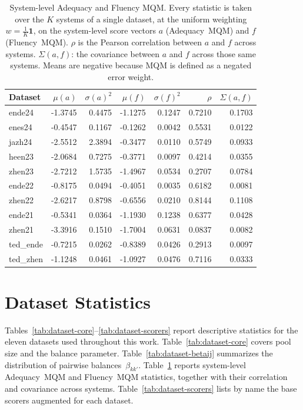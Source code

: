\documentclass[11pt]{article}
\begin{document}
\begin{table}[t]
\centering
\begin{tabular}{lrrrrrr}
\toprule
Dataset & $\mu(a)$ & $\sigma(a)^2$ & $\mu(f)$ & $\sigma(f)^2$ & $\rho$ & $\Sigma(a,f)$ \\
\midrule
ende24 & -1.3745 & 0.4475 & -1.1275 & 0.1247 & 0.7210 & 0.1703 \\
enes24 & -0.4547 & 0.1167 & -0.1262 & 0.0042 & 0.5531 & 0.0122 \\
jazh24 & -2.5512 & 2.3894 & -0.3477 & 0.0110 & 0.5749 & 0.0933 \\
heen23 & -2.0684 & 0.7275 & -0.3771 & 0.0097 & 0.4214 & 0.0355 \\
zhen23 & -2.7212 & 1.5735 & -1.4967 & 0.0534 & 0.2707 & 0.0784 \\
ende22 & -0.8175 & 0.0494 & -0.4051 & 0.0035 & 0.6182 & 0.0081 \\
zhen22 & -2.6217 & 0.8798 & -0.6556 & 0.0210 & 0.8144 & 0.1108 \\
ende21 & -0.5341 & 0.0364 & -1.1930 & 0.1238 & 0.6377 & 0.0428 \\
zhen21 & -3.3916 & 0.1510 & -1.7004 & 0.0631 & 0.0837 & 0.0082 \\
ted\_ende & -0.7215 & 0.0262 & -0.8389 & 0.0426 & 0.2913 & 0.0097 \\
ted\_zhen & -1.1248 & 0.0461 & -1.0927 & 0.0476 & 0.7116 & 0.0333 \\
\bottomrule
\end{tabular}%
\caption{System-level Adequacy and Fluency MQM. Every statistic is taken over the $K$ systems of a single dataset, at the uniform weighting $w=\tfrac1K\mathbf 1$, on the system-level score vectors $a$ (Adequacy~MQM) and $f$ (Fluency~MQM). $\rho$ is the Pearson correlation between $a$ and $f$ across systems. $\Sigma(a,f)$: the covariance between $a$ and $f$ across those same systems. Means are negative because MQM is defined as a negated error weight.}
\label{tab:dataset-mqm}
\end{table}

\section{Dataset Statistics}
\label{app:datasetstats}

Tables~\ref{tab:dataset-core}--\ref{tab:dataset-scorers} report descriptive
statistics for the eleven datasets used throughout this work.
Table~\ref{tab:dataset-core} covers pool size and the balance parameter. Table~\ref{tab:dataset-betaij} summarizes the
distribution of pairwise balances~$\beta_{kk'}$.
Table~\ref{tab:dataset-mqm} reports system-level Adequacy~MQM and Fluency~MQM statistics, together with their correlation and
covariance across systems. Table~\ref{tab:dataset-scorers} lists by name the
base scorers augmented for each dataset.
\end{document}
